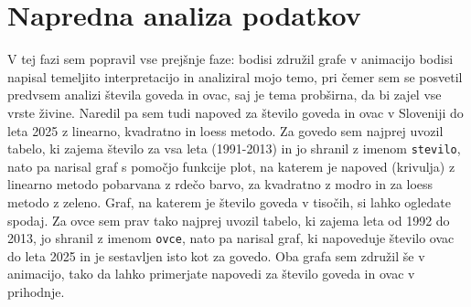 \documentclass[11pt,a4paper]{article}
\begin{document}
\section{Napredna analiza podatkov}
V tej fazi sem popravil vse prejšnje faze: bodisi združil grafe v animacijo bodisi napisal temeljito interpretacijo in analiziral mojo temo, pri čemer sem se posvetil predvsem analizi števila goveda in ovac, saj je tema probširna, da bi zajel vse vrste živine. Naredil pa sem tudi napoved za število goveda in ovac v Sloveniji do leta 2025 z linearno, kvadratno in loess metodo. Za govedo sem najprej uvozil tabelo, ki zajema število za vsa leta (1991-2013) in jo shranil z imenom \verb|stevilo|, nato pa narisal graf s pomočjo funkcije plot, na katerem je napoved (krivulja) z linearno metodo pobarvana z rdečo barvo, za kvadratno z modro in za loess metodo z zeleno. Graf, na katerem je število goveda v tisočih, si lahko ogledate spodaj. Za ovce sem prav tako najprej uvozil tabelo, ki zajema leta od 1992 do 2013, jo shranil z imenom \verb|ovce|, nato pa narisal graf, ki napoveduje število ovac do leta 2025 in je sestavljen isto kot za govedo. Oba grafa sem združil še v animacijo, tako da lahko primerjate napovedi za število goveda in ovac v prihodnje. 

\begin{center}
\\
\end{center}
\end{document}
